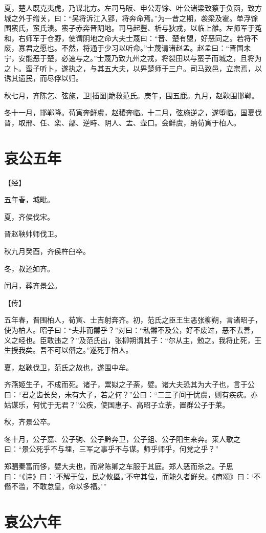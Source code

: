 \documentclass[a4paper,12pt,UTF8,twoside]{ctexbook}
\begin{document}
夏，楚人既克夷虎，乃谋北方。左司马眅、申公寿馀、叶公诸梁致蔡于负函，致方城之外于缯关，曰：“吴将泝江入郢，将奔命焉。”为一昔之期，袭梁及霍。单浮馀围蛮氏，蛮氏溃。蛮子赤奔晋阴地。司马起豐、析与狄戎，以临上雒。左师军于菟和，右师军于仓野，使谓阴地之命大夫士蔑曰：“晋、楚有盟，好恶同之。若将不废，寡君之愿也。不然，将通于少习以听命。”士蔑请诸赵孟。赵孟曰：“晋国未宁，安能恶于楚，必速与之。”士蔑乃致九州之戎，将裂田以与蛮子而城之，且将为之卜。蛮子听卜，遂执之，与其五大夫，以畀楚师于三户。司马致邑，立宗焉，以诱其遗民，而尽俘以归。

秋七月，齐陈乞、弦施，卫[插图]跪救范氏。庚午，围五鹿。九月，赵鞅围邯郸。

冬十一月，邯郸降。荀寅奔鲜虞，赵稷奔临。十二月，弦施逆之，遂堕临。国夏伐晋，取邢、任、栾、鄗、逆畤、阴人、盂、壶口。会鲜虞，纳荀寅于柏人。


\section{哀公五年}


【经】

五年春，城毗。

夏，齐侯伐宋。

晋赵鞅帅师伐卫。

秋九月癸酉，齐侯杵臼卒。

冬，叔还如齐。

闰月，葬齐景公。

【传】

五年春，晋围柏人，荀寅、士吉射奔齐。初，范氏之臣王生恶张柳朔，言诸昭子，使为柏人。昭子曰：“夫非而讎乎？”对曰：“私讎不及公，好不废过，恶不去善，义之经也。臣敢违之？”及范氏出，张柳朔谓其子：“尔从主，勉之。我将止死，王生授我矣。吾不可以僭之。”遂死于柏人。

夏，赵鞅伐卫，范氏之故也，遂围中牟。

齐燕姬生子，不成而死。诸子，鬻姒之子荼，嬖。诸大夫恐其为大子也，言于公曰：“君之齿长矣，未有大子，若之何？”公曰：“二三子间于忧虞，则有疾疢。亦姑谋乐，何忧于无君？”公疾，使国惠子、高昭子立荼，置群公子于莱。

秋，齐景公卒。

冬十月，公子嘉、公子驹、公子黔奔卫，公子鉏、公子阳生来奔。莱人歌之曰：“景公死乎不与埋，三军之事乎不与谋。师乎师乎，何党之乎？”

郑驷秦富而侈，嬖大夫也，而常陈卿之车服于其庭。郑人恶而杀之。子思曰：“《诗》曰：‘不解于位，民之攸塈。’不守其位，而能久者鲜矣。《商颂》曰：‘不僭不滥，不敢怠皇，命以多福。’”


\section{哀公六年}
\end{document}
